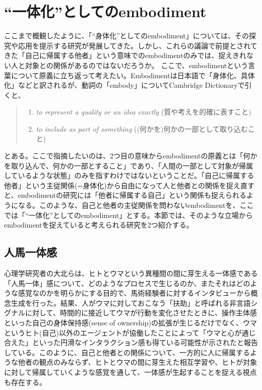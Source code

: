 \section{``一体化''としてのembodiment}
ここまで概観したように、「``身体化''としてのembodiment」については、その探究や応用を提示する研究が発展してきた。しかし、これらの議論で前提とされてきた「自己に帰属する他者」という意味でのembodimentのみでは、捉えきれない人と対象との関係があるのではないだろうか。
ここで、embodimentという言葉について原義に立ち返って考えたい。Embodimentは日本語で「身体化、具体化」などと訳されるが、動詞の「embody」についてCambridge Dictionaryで引くと、
\begin{quote}
  \begin{enumerate}
    \item \textit{to represent a quality or an idea exactly} (質や考えを的確に表すこと) 
    \item \textit{to include as part of something} ((何かを)何かの一部として取り込むこと)
  \end{enumerate}
\end{quote}
とある\cite{embody}。ここで指摘したいのは、2つ目の意味からembodimentの原義とは「何かを取り込んで、何かの一部とすること」であり、「人間の一部として対象が帰属しているような状態」のみを指すわけではないということだ。「自己に帰属する他者」という主従関係(=身体化)から自由になって人と他者との関係を捉え直すと、embodimentの研究には「他者に帰属する自己」という関係も捉えられるようになる。このような、自己と他者の主従関係を問わないembodimentを、ここでは「``一体化''としてのembodiment」とする。本節では、そのような立場からembodimentを捉えていると考えられる研究を2つ紹介する。

\subsection{人馬一体感}
心理学研究者の大北らは、ヒトとウマという異種間の間に芽生える一体感である「人馬一体」感について、どのようなプロセスで生じるのか、またそれはどのような感覚なのかを明らかにする目的で、馬術経験者に対するインタビューから概念生成を行った\cite{ohkita2018}。結果、人がウマに対しておこなう「扶助」と呼ばれる非言語シグナルに対して、時間的に接近してウマが行動を変化させたときに、操作主体感といった自己の身体保持感(sense of ownership)の拡張が生じるだけでなく、ウマというヒト(自己)以外のエージェントが協働したことによって「ウマと心が通じ合えた」といった円滑なインタラクション感も得ている可能性が示されたと報告している。このように、自己と他者との関係について、一方的に人に帰属するような他者の観点のみならず、ヒトとウマの間に芽生えた相互学習や、ヒトが対象に対して帰属していくような感覚を通して、一体感が生起することを捉える視点も存在する。

